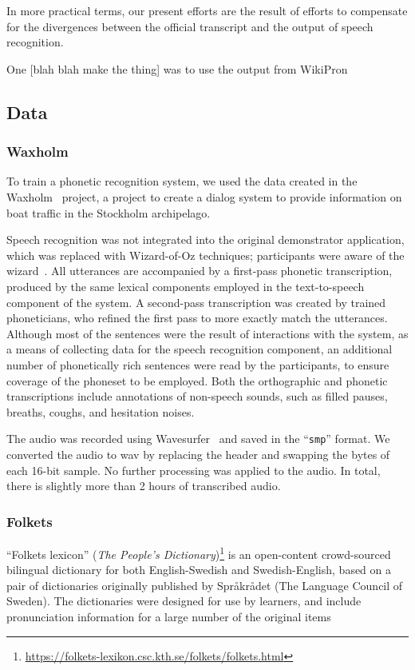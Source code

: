 \documentclass{Interspeech}
\begin{document}
In more practical terms, our present efforts are the result of efforts to compensate for the divergences between the official transcript and the output of speech recognition.

One [blah blah make the thing] was to use the output from WikiPron~\cite{lee-etal-2020-massively}

\subsection{Data}

\subsubsection{Waxholm}
To train a phonetic recognition system, we used the data created in the Waxholm~\cite{bertenstam1995waxholm} project, a project to create a dialog system to provide information on boat traffic in the Stockholm archipelago.

Speech recognition was not integrated into the original demonstrator application, which was replaced with Wizard-of-Oz techniques; participants were aware of the wizard~\cite{blomberg1993waxholm}. All utterances are accompanied by a first-pass phonetic transcription, produced by the same lexical components employed in the text-to-speech component of the system. A second-pass transcription was created by trained phoneticians, who refined the first pass to more exactly match the utterances. Although most of the sentences were the result of interactions with the system, as a means of collecting data for the speech recognition component, an additional number of phonetically rich sentences were read by the participants, to ensure coverage of the phoneset to be employed. Both the orthographic and phonetic transcriptions include annotations of non-speech sounds, such as filled pauses, breaths, coughs, and hesitation noises.

The audio was recorded using Wavesurfer~\cite{sjolander2000wavesurfer} and saved in the ``\texttt{smp}'' format. We converted the audio to wav by replacing the header and swapping the bytes of each 16-bit sample. No further processing was applied to the audio. In total, there is slightly more than 2 hours of transcribed audio.

\subsubsection{Folkets}

``Folkets lexicon'' (\textit{The People's Dictionary})\footnote{\url{https://folkets-lexikon.csc.kth.se/folkets/folkets.html}} is an open-content crowd-sourced bilingual dictionary for both English-Swedish and Swedish-English, based on a pair of dictionaries originally published by Språkrådet (The Language Council of Sweden). The dictionaries were designed for use by learners, and include pronunciation information for a large number of the original items
\end{document}
